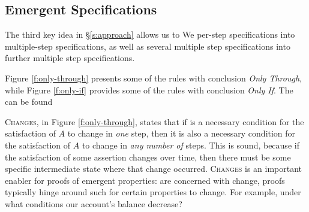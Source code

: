 %
\subsection{Emergent \Nec Specifications}
\label{s:emergent-proof}

The third key idea in \S \ref{s:approach}  allows us to
We
   per-step \Nec specifications into  
multiple-step \Nec specifications, as well as several  multiple step \Nec specifications into further multiple step \Nec specifications.

 Figure \ref{f:only-through}  {presents} some of the rules with conclusion \emph{Only Through}, while Figure \ref{f:only-if}
provides some of the rules with conclusion \emph{Only If}. 
The  can be found  %


\textsc{Changes}, in Figure \ref{f:only-through}, 
{states that 
if    is a necessary condition for the satisfaction of $A$ to change  in \emph{one} step, then
it is also a  necessary condition for the satisfaction of $A$ to change  in \emph{any number of} steps.
This is sound, because if  the satisfaction of some assertion changes over time, then 
 there must be some specific intermediate state where that change occurred.}
\textsc{Changes} is an important %
 enabler for proofs of emergent properties:
  are concerned with  change,
 proofs typically hinge around such  for certain properties  %
to change. For example,
under what conditions  our account's balance decrease? 

